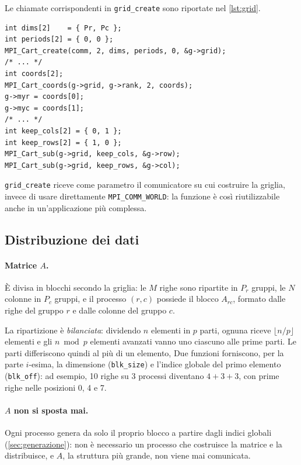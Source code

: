 \documentclass[11pt,a4paper]{article}
\begin{document}
Le chiamate corrispondenti in \texttt{grid\_create} sono riportate nel
\cref{lst:grid}.

\begin{lstlisting}[caption={Costruzione della griglia e dei comunicatori di riga e di colonna (\texttt{distrib.c}).}, label={lst:grid}]
int dims[2]    = { Pr, Pc };
int periods[2] = { 0, 0 };
MPI_Cart_create(comm, 2, dims, periods, 0, &g->grid);
/* ... */
int coords[2];
MPI_Cart_coords(g->grid, g->rank, 2, coords);
g->myr = coords[0];
g->myc = coords[1];
/* ... */
int keep_cols[2] = { 0, 1 };
int keep_rows[2] = { 1, 0 };
MPI_Cart_sub(g->grid, keep_cols, &g->row);
MPI_Cart_sub(g->grid, keep_rows, &g->col);
\end{lstlisting}

\texttt{grid\_create} riceve come parametro il comunicatore su cui costruire
la griglia, invece di usare direttamente \texttt{MPI\_COMM\_WORLD}: la funzione
è così riutilizzabile anche in un'applicazione più complessa.

\subsection{Distribuzione dei dati}\label{sec:distribuzione}

\paragraph{Matrice $A$.} È divisa in blocchi secondo la griglia: le $M$ righe
sono ripartite in $P_r$ gruppi, le $N$ colonne in $P_c$ gruppi, e il processo
$(r, c)$ possiede il blocco $A_{rc}$, formato dalle righe del gruppo $r$ e
dalle colonne del gruppo $c$.

La ripartizione è \emph{bilanciata}: dividendo $n$ elementi in $p$ parti,
ognuna riceve $\lfloor n/p \rfloor$ elementi e gli $n \bmod p$ elementi
avanzati vanno uno ciascuno alle prime parti. Le parti differiscono quindi al
più di un elemento,
 Due funzioni forniscono, per la parte $i$-esima, la dimensione
(\texttt{blk\_size}) e l'indice globale del primo elemento
(\texttt{blk\_off}): ad esempio, 10 righe su 3 processi diventano
$4 + 3 + 3$, con prime righe nelle posizioni 0, 4 e 7.

\paragraph{$A$ non si sposta mai.} Ogni processo genera da solo il proprio
blocco a partire dagli indici globali (\cref{sec:generazione}): non è necessario
un processo che costruisce la matrice e la distribuisce, e $A$, la struttura più
grande, non viene mai comunicata.
\end{document}
